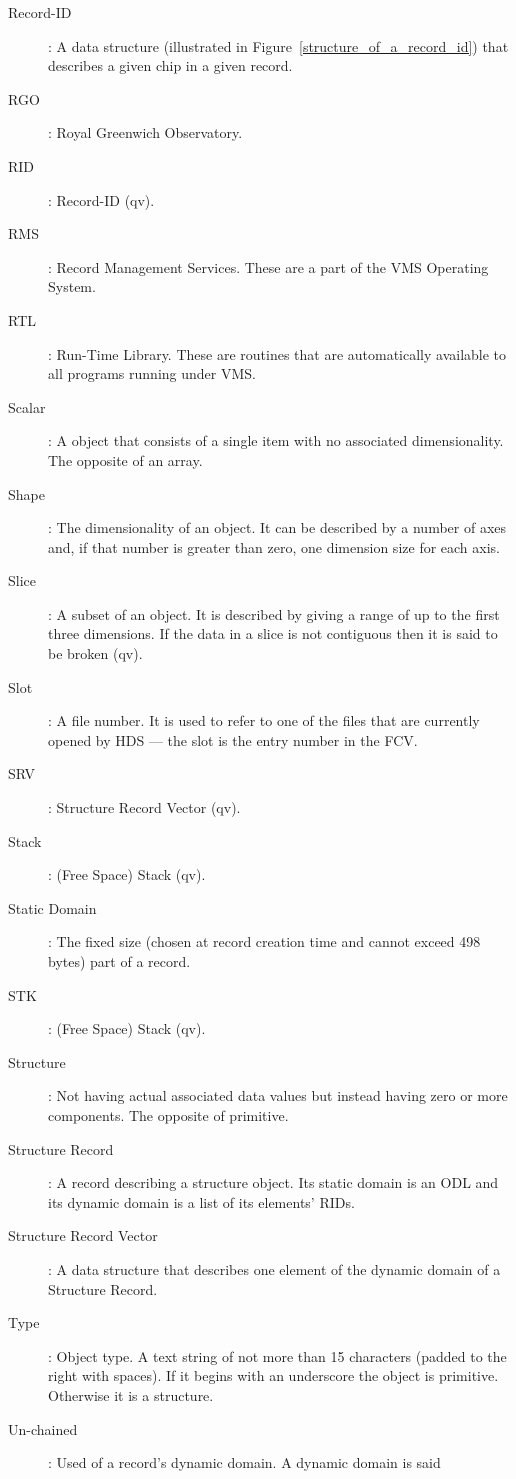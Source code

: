 \begin {description}
\item [Record-ID]: A data structure (illustrated in
Figure~\ref{structure_of_a_record_id}) that describes a given chip in a given
record.
\item [RGO]: Royal Greenwich Observatory.
\item [RID]: Record-ID (qv).
\item [RMS]: Record Management Services. These are a part of the VMS Operating
System.
\item [RTL]: Run-Time Library. These are routines that are automatically
available to all programs running under VMS.
\item [Scalar]: A object that consists of a single item with no associated
dimensionality. The opposite of an array.
\item [Shape]: The dimensionality of an object. It can be described by a
number of axes and, if that number is greater than zero, one dimension size
for each axis.
\item [Slice]: A subset of an object. It is described by giving a range of
up to the first three dimensions. If the data in a slice is not contiguous
then it is said to be broken (qv).
\item [Slot]: A file number. It is used to refer to one of the files that
are currently opened by HDS --- the slot is the entry number in the FCV.
\item [SRV]: Structure Record Vector (qv).
\item [Stack]: (Free Space) Stack (qv).
\item [Static Domain]: The fixed size (chosen at record creation time and
cannot exceed 498 bytes) part of a record.
\item [STK]: (Free Space) Stack (qv).
\item [Structure]: Not having actual associated data values but instead having
zero or more components. The opposite of primitive.
\item [Structure Record]: A record describing a structure object. Its static
domain is an ODL and its dynamic domain is a list of its elements' RIDs.
\item [Structure Record Vector]: A data structure that describes one element
of the dynamic domain of a Structure Record. 
\item [Type]: Object type. A text string of not more than 15 characters
(padded to the right with spaces). If it begins with an underscore the object
is primitive. Otherwise it is a structure.
\item [Un-chained]: Used of a record's dynamic domain. A dynamic domain is said

\end{description}

